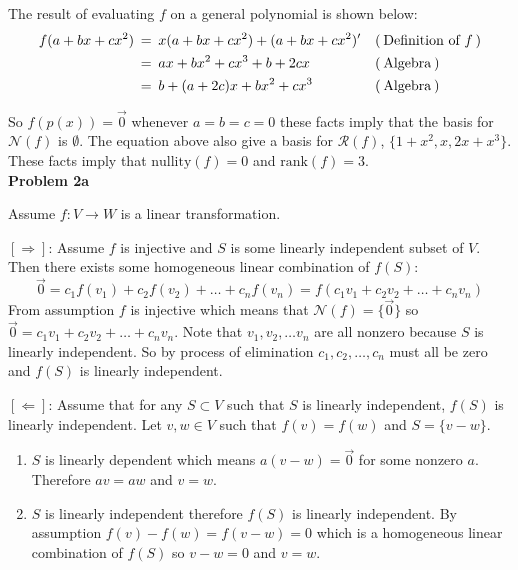 \documentclass{article}
\newcommand{\problem}[1]{\large\textbf{Problem #1}\normalsize}
\newcommand{\evidence}[1]{\ensuremath{(\hspace{0.2em} \text{#1} \hspace{0.2em})}}
\newcommand{\relation}[1]{\ensuremath{\hspace{0.2em} {{} #1 {}} \hspace{0.2em}}}
\newcommand{\equal}{\relation{=}}
\begin{document}
The result of evaluating $f$ on a general polynomial is shown below:
\begin{align*}
  f(a + bx + cx^2)
     & \equal x(a + bx + cx^2) + (a + bx + cx^2)' && \evidence{Definition of $f$} \\
  {} & \equal ax + bx^2 + cx^3 + b + 2cx          && \evidence{Algebra} \\
  {} & \equal b + (a + 2c)x + bx^2 + cx^3         && \evidence{Algebra}
\end{align*}

So $f(p(x)) = \vec{0}$ whenever $a = b = c = 0$ these facts imply that the basis for $\mathcal{N}(f)$
is $\emptyset$. The equation above also give a basis for $\mathcal{R}(f)$,
$\{ 1 + x^2, x, 2x + x^3 \}$. These facts imply that $\text{nullity}(f) = 0$ and
$\text{rank}(f) = 3$. \\

\problem{2a}

Assume $f : V \to W$ is a linear transformation.

$[\Rightarrow]$: Assume $f$ is injective and $S$ is
some linearly independent subset of $V$. Then there exists some homogeneous
linear combination of $f(S)$:
\begin{equation*}
  \vec{0} = c_1f(v_1) + c_2f(v_2) + \dots + c_nf(v_n) = f(c_1v_1 + c_2v_2 + \dots + c_nv_n)
\end{equation*}
From assumption $f$ is injective which means that
$\mathcal{N}(f) = \{ \vec{0} \}$ so $\vec{0} = c_1v_1 + c_2v_2 + \dots + c_nv_n$.
Note that $v_1, v_2, \dots v_n$ are all nonzero because $S$ is linearly
independent. So by process of elimination $c_1, c_2,\dots,c_n$ must all be zero and
$f(S)$ is linearly independent.

\vspace{0.2em}

$[\Leftarrow]$: Assume that for any $S \subset V$ such that $S$ is linearly independent,
$f(S)$ is linearly independent. Let $v, w \in V$ such that $f(v) = f(w)$ and
$S = \{ v - w \}$. 
\begin{enumerate}[label=\roman*:]
\item
  $S$ is linearly dependent which means $a(v - w) = \vec{0}$ for some nonzero
  $a$. Therefore $av = aw$ and $v = w$.
\item
  $S$ is linearly independent therefore $f(S)$ is linearly independent.
  By assumption $f(v) - f(w) = f(v - w) = 0$ which is a homogeneous linear combination of
  $f(S)$ so $v - w = 0$ and $v = w$.
\end{enumerate}
\end{document}
